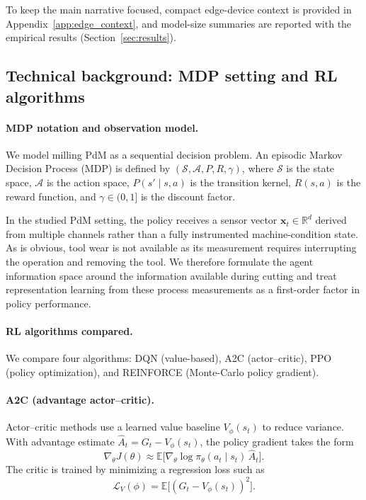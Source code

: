 \documentclass[sn-basic]{sn-jnl} %
\begin{document}
To keep the main narrative focused, compact edge-device context is provided in Appendix~\ref{app:edge_context}, and model-size summaries are reported with the empirical results (Section~\ref{sec:results}).

\subsection{Technical background: MDP setting and RL algorithms}
\label{sec:tech_background}
\paragraph{MDP notation and observation model.}
We model milling PdM as a sequential decision problem. An episodic Markov Decision Process (MDP) is defined by $(\mathcal{S},\mathcal{A},P,R,\gamma)$, where $\mathcal{S}$ is the state space, $\mathcal{A}$ is the action space, $P(s'\mid s,a)$ is the transition kernel, $R(s,a)$ is the reward function, and $\gamma\in(0,1]$ is the discount factor.

In the studied PdM setting, the policy receives a sensor vector $\mathbf{x}_t\in\mathbb{R}^d$ derived from multiple channels rather than a fully instrumented machine-condition state. As is obvious, tool wear is not available as its measurement requires interrupting the operation and removing the tool. We therefore formulate the agent information space around the information available during cutting and treat representation learning from these process measurements as a first-order factor in policy performance.

\paragraph{RL algorithms compared.}
We compare four algorithms: DQN (value-based), A2C (actor--critic), PPO (policy optimization), and REINFORCE (Monte-Carlo policy gradient).

\paragraph{A2C (advantage actor--critic).}
Actor--critic methods use a learned value baseline $V_\phi(s_t)$ to reduce variance. With advantage estimate $\hat{A}_t=G_t-V_\phi(s_t)$, the policy gradient takes the form
\begin{equation}
\nabla_\theta J(\theta) \approx \mathbb{E}\big[\nabla_\theta\log\pi_\theta(a_t\mid s_t)\,\hat{A}_t\big].
\end{equation}
The critic is trained by minimizing a regression loss such as
\begin{equation}
\mathcal{L}_V(\phi)=\mathbb{E}\big[(G_t - V_\phi(s_t))^2\big].
\end{equation}
\end{document}
